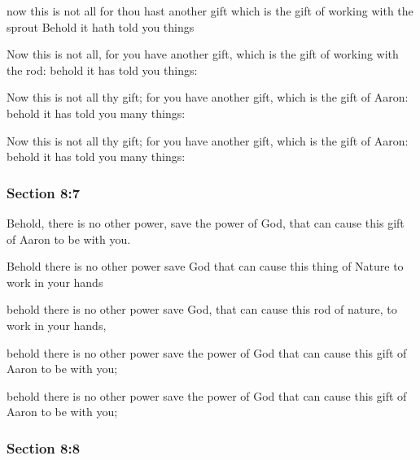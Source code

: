 		\begin{framed}
		\scriptsize
			\begin{compactdesc}
				\item[JSP] now this is not all for thou hast another gift which is the gift of working with the sprout Behold it hath told you things
				\item[BC] Now this is not all, for you have another gift, which is the gift of working with the rod: behold it has told you things:
				\item[DC 1835] Now this is not all thy gift; for you have another gift, which is the gift of Aaron: behold it has told you many things:
				\item[DC 1844] Now this is not all thy gift; for you have another gift, which is the gift of Aaron: behold it has told you many things: 
			\end{compactdesc}
		\end{framed}

	\subsubsection{Section 8:7} %
		\label{DC8-7}

		Behold, there is no other power, save the power of God, that can cause this gift of Aaron to be with you.

		\begin{framed}
		\scriptsize
			\begin{compactdesc}
				\item[JSP] Behold there is no other power save God that can cause this thing of Nature to work in your hands
				\item[BC] behold there is no other power save God, that can cause this rod of nature, to work in your hands,
				\item[DC 1835] behold there is no other power save the power of God that can cause this gift of Aaron to be with you;
				\item[DC 1844] behold there is no other power save the power of God that can cause this gift of Aaron to be with you; 
			\end{compactdesc}
		\end{framed}

	\subsubsection{Section 8:8} %
		\label{DC8-8}

